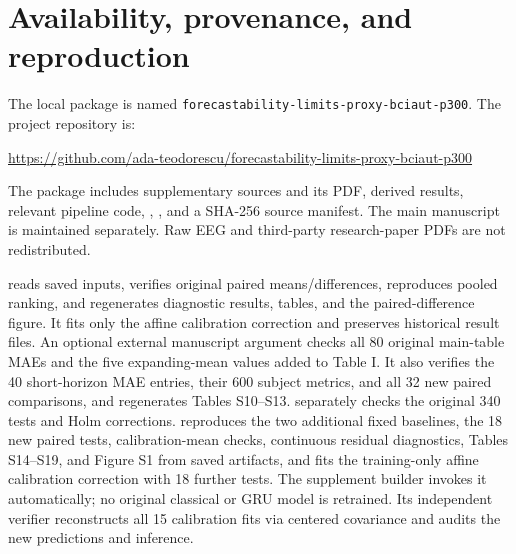 \documentclass[a4paper,10pt,onecolumn]{IEEEtran}
\newcommand{\repositorylink}{\url{https://github.com/ada-teodorescu/forecastability-limits-proxy-bciaut-p300}}
\begin{document}
\clearpage
\section{Availability, provenance, and reproduction}

The local package is named \texttt{forecastability-limits-proxy-bciaut-p300}.
The project repository is:\par
\repositorylink\par
The package includes supplementary sources and its PDF, derived results,
relevant pipeline code, , , and a SHA-256
source manifest. The main manuscript is maintained separately.
Raw EEG and third-party research-paper PDFs are not redistributed.

 reads saved inputs, verifies
original paired means/differences, reproduces pooled
ranking, and regenerates diagnostic results, tables, and the paired-difference
figure. It fits only the affine calibration correction and preserves historical
result files. An optional external manuscript argument checks all 80 original
main-table MAEs and the five expanding-mean values added to Table I.
It also verifies the 40 short-horizon MAE entries, their 600 subject metrics,
and all 32 new paired comparisons, and regenerates Tables S10--S13.
 separately checks the original
340 tests and Holm corrections.
 reproduces the two additional
fixed baselines, the 18 new paired tests, calibration-mean checks, continuous
residual diagnostics, Tables S14--S19, and Figure S1 from saved artifacts,
and fits the training-only affine calibration correction with 18 further tests.
The supplement builder invokes it automatically; no original classical or GRU
model is retrained. Its independent verifier reconstructs all 15 calibration
fits via centered covariance and audits the new predictions and inference.
\end{document}
